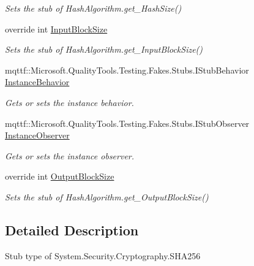 \begin{DoxyCompactItemize}
\begin{DoxyCompactList}\small\item\em Sets the stub of Hash\-Algorithm.\-get\-\_\-\-Hash\-Size()\end{DoxyCompactList}\item 
override int \hyperlink{class_system_1_1_security_1_1_cryptography_1_1_fakes_1_1_stub_s_h_a256_a83dd91707c884c8e60ab6c823300b366}{Input\-Block\-Size}
\begin{DoxyCompactList}\small\item\em Sets the stub of Hash\-Algorithm.\-get\-\_\-\-Input\-Block\-Size()\end{DoxyCompactList}\item 
mqttf\-::\-Microsoft.\-Quality\-Tools.\-Testing.\-Fakes.\-Stubs.\-I\-Stub\-Behavior \hyperlink{class_system_1_1_security_1_1_cryptography_1_1_fakes_1_1_stub_s_h_a256_af0866633d7d6b28361270716b4921275}{Instance\-Behavior}
\begin{DoxyCompactList}\small\item\em Gets or sets the instance behavior.\end{DoxyCompactList}\item 
mqttf\-::\-Microsoft.\-Quality\-Tools.\-Testing.\-Fakes.\-Stubs.\-I\-Stub\-Observer \hyperlink{class_system_1_1_security_1_1_cryptography_1_1_fakes_1_1_stub_s_h_a256_a7dc6009fa3ed787034cb9178f372aefe}{Instance\-Observer}
\begin{DoxyCompactList}\small\item\em Gets or sets the instance observer.\end{DoxyCompactList}\item 
override int \hyperlink{class_system_1_1_security_1_1_cryptography_1_1_fakes_1_1_stub_s_h_a256_ae070269c431baf285cb2e18a379c166a}{Output\-Block\-Size}
\begin{DoxyCompactList}\small\item\em Sets the stub of Hash\-Algorithm.\-get\-\_\-\-Output\-Block\-Size()\end{DoxyCompactList}\end{DoxyCompactItemize}


\subsection{Detailed Description}
Stub type of System.\-Security.\-Cryptography.\-S\-H\-A256



